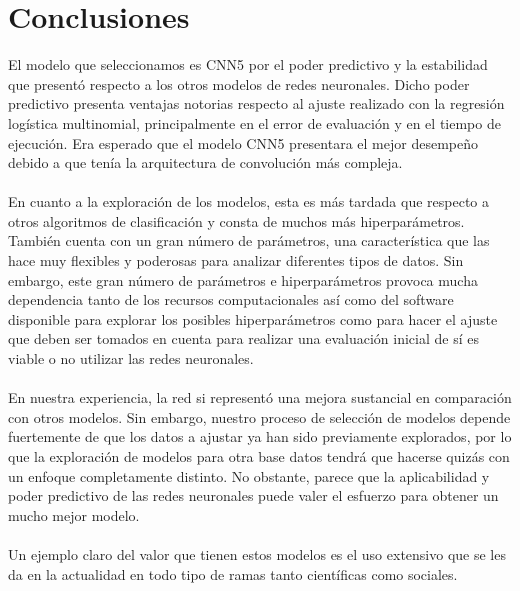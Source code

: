 \documentclass[11pt]{article}
\begin{document}
\section{Conclusiones}
El modelo que seleccionamos es CNN5 por el poder predictivo y la estabilidad que presentó respecto a los otros modelos de redes neuronales. Dicho poder predictivo  presenta ventajas notorias respecto al ajuste realizado con la regresión logística multinomial, principalmente en el error de evaluación y en el tiempo de ejecución. Era esperado que el modelo CNN5 presentara el mejor desempeño debido a que tenía la arquitectura de convolución más compleja.
\\
\\En cuanto a la exploración de los modelos, esta es más tardada que respecto a otros algoritmos de clasificación y consta de muchos más hiperparámetros. También cuenta con un gran número de parámetros, una característica que las  hace muy flexibles y poderosas para analizar diferentes tipos de datos. Sin embargo, este gran número de parámetros e hiperparámetros provoca mucha dependencia tanto de los recursos computacionales así como del software disponible para explorar los posibles hiperparámetros como para hacer el ajuste que deben ser tomados en cuenta para realizar una evaluación inicial de sí es viable o no utilizar las redes neuronales.
\\
\\En nuestra experiencia, la red si representó una mejora sustancial en comparación con otros modelos. Sin embargo, nuestro proceso de selección de modelos depende fuertemente de que los datos a ajustar ya han sido previamente explorados, por lo que la exploración de modelos para otra base datos tendrá que hacerse quizás con un enfoque completamente distinto. No obstante, parece que la aplicabilidad y poder predictivo de las redes neuronales puede valer el esfuerzo para obtener un mucho mejor modelo. 
\\
\\Un ejemplo claro del valor que tienen estos modelos es el uso extensivo que se les da en la actualidad en todo tipo de ramas tanto científicas como sociales. 
\pagebreak
\end{document}
